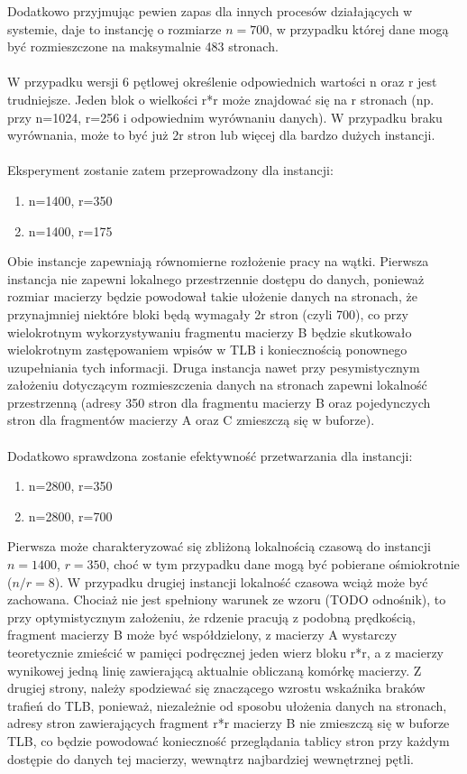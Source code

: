 \documentclass[12pt,a4paper]{article}
\begin{document}
Dodatkowo przyjmując pewien zapas dla innych procesów działających w systemie, daje to instancję o rozmiarze $n=700$, w przypadku której dane mogą być rozmieszczone na maksymalnie 483 stronach.\\
\\
W przypadku wersji 6 pętlowej określenie odpowiednich wartości n oraz r jest trudniejsze. Jeden blok o wielkości r*r może znajdować się na r stronach (np. przy n=1024, r=256 i odpowiednim wyrównaniu danych). W przypadku braku wyrównania, może to być już 2r stron lub więcej dla bardzo dużych instancji.\\
\\
Eksperyment zostanie zatem przeprowadzony dla instancji:
\begin{enumerate}
\item n=1400, r=350
\item n=1400, r=175
\end{enumerate}

Obie instancje zapewniają równomierne rozłożenie pracy na wątki. Pierwsza instancja nie zapewni lokalnego przestrzennie dostępu do danych, ponieważ rozmiar macierzy będzie powodował takie ułożenie danych na stronach, że przynajmniej niektóre bloki będą wymagały 2r stron (czyli 700), co przy wielokrotnym wykorzystywaniu fragmentu macierzy B będzie skutkowało wielokrotnym zastępowaniem wpisów w TLB i koniecznością ponownego uzupełniania tych informacji. Druga instancja nawet przy pesymistycznym założeniu dotyczącym rozmieszczenia danych na stronach zapewni lokalność przestrzenną (adresy 350 stron dla fragmentu macierzy B oraz pojedynczych stron dla fragmentów macierzy A oraz C zmieszczą się w buforze).\\
\\
Dodatkowo sprawdzona zostanie efektywność przetwarzania dla instancji:
\begin{enumerate}
\item n=2800, r=350
\item n=2800, r=700
\end{enumerate}

Pierwsza może charakteryzować się zbliżoną lokalnością czasową do instancji $n=1400$, $r=350$, choć w tym przypadku dane mogą być pobierane ośmiokrotnie ($n/r = 8$). W przypadku drugiej instancji lokalność czasowa wciąż może być zachowana. Chociaż nie jest spełniony warunek ze wzoru (TODO odnośnik), to przy optymistycznym założeniu, że rdzenie pracują z podobną prędkością, fragment macierzy B może być współdzielony, z macierzy A wystarczy teoretycznie zmieścić w pamięci podręcznej jeden wierz bloku r*r, a z macierzy wynikowej jedną linię zawierającą aktualnie obliczaną komórkę macierzy. Z drugiej strony, należy spodziewać się znaczącego wzrostu wskaźnika braków trafień do TLB, ponieważ, niezależnie od sposobu ułożenia danych na stronach, adresy stron zawierających fragment r*r macierzy B nie zmieszczą się w buforze TLB, co będzie powodować konieczność przeglądania tablicy stron przy każdym dostępie do danych tej macierzy, wewnątrz najbardziej wewnętrznej pętli.
\end{document}
